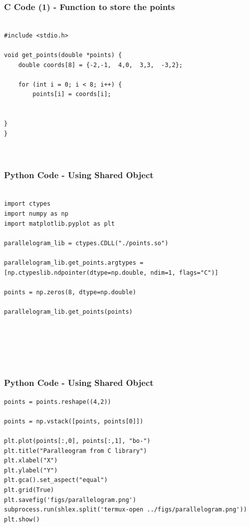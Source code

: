 \documentclass{beamer}
\begin{document}
\begin{frame}[fragile]
    \frametitle{C Code (1) - Function to store the points }

    \begin{lstlisting}

#include <stdio.h>

void get_points(double *points) {
    double coords[8] = {-2,-1,  4,0,  3,3,  -3,2};

    for (int i = 0; i < 8; i++) {
        points[i] = coords[i];
    

}
}



    \end{lstlisting}
\end{frame}


\begin{frame}[fragile]
    \frametitle{Python Code - Using Shared Object}
    \begin{lstlisting}

import ctypes
import numpy as np
import matplotlib.pyplot as plt

parallelogram_lib = ctypes.CDLL("./points.so")

parallelogram_lib.get_points.argtypes = [np.ctypeslib.ndpointer(dtype=np.double, ndim=1, flags="C")]

points = np.zeros(8, dtype=np.double)

parallelogram_lib.get_points(points)






\end{lstlisting}
\end{frame}

\begin{frame}[fragile]
    \frametitle{Python Code - Using Shared Object}
    \begin{lstlisting}
points = points.reshape((4,2))

points = np.vstack([points, points[0]])

plt.plot(points[:,0], points[:,1], "bo-")
plt.title("Paralleogram from C library")
plt.xlabel("X")
plt.ylabel("Y")
plt.gca().set_aspect("equal")
plt.grid(True)
plt.savefig('figs/parallelogram.png')
subprocess.run(shlex.split('termux-open ../figs/parallelogram.png'))
plt.show()


\end{lstlisting}
\end{frame}
\end{document}
